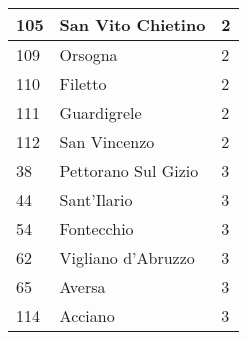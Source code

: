 \begin{table}[t]
\begin{tabular}{|p{1cm}|p{4cm}|p{2cm}|}
\rowcolor[HTML]{FFFE65} 
105 & San Vito Chietino                        & 2      \\ \hline
\rowcolor[HTML]{FFFE65} 
109 & Orsogna                                  & 2      \\ \hline
\rowcolor[HTML]{FFFE65} 
110 & Filetto                                  & 2      \\ \hline
\rowcolor[HTML]{FFFE65} 
111 & Guardigrele                              & 2      \\ \hline
\rowcolor[HTML]{FFFE65} 
112 & San Vincenzo                             & 2      \\ \hline
\rowcolor[HTML]{FFCCC9} 
38  & Pettorano Sul Gizio                      & 3      \\ \hline
\rowcolor[HTML]{FFCCC9} 
44  & Sant'Ilario                              & 3      \\ \hline
\rowcolor[HTML]{FFCCC9} 
54  & Fontecchio                               & 3      \\ \hline
\rowcolor[HTML]{FFCCC9} 
62  & Vigliano d'Abruzzo                       & 3      \\ \hline
\rowcolor[HTML]{FFCCC9} 
65  & Aversa                                   & 3      \\ \hline
\rowcolor[HTML]{FFCCC9} 
114 & Acciano                                  & 3      \\ \hline
\end{tabular}
\end{table}


